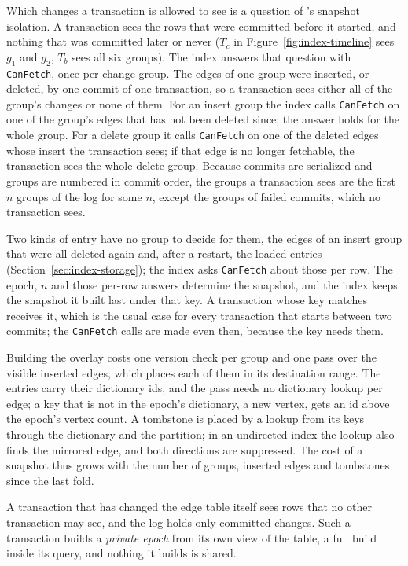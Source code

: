 Which changes a transaction is allowed to see is a question of \duckdb's snapshot isolation. A transaction sees the
rows that were committed before it started, and nothing that was committed later or never ($T_c$ in
Figure~\ref{fig:index-timeline} sees $g_1$ and $g_2$, $T_b$ sees all six groups). The index answers that question with \texttt{CanFetch}, once per change group. The edges of one group were inserted, or deleted, by one commit of one transaction, so a transaction sees either
all of the group's changes or none of them. For an insert group the index calls \texttt{CanFetch} on one of the
group's edges that has not been deleted since; the answer holds for the whole group. For a delete group it calls
\texttt{CanFetch} on one of the deleted edges whose insert the transaction sees; if that edge is no longer fetchable,
the transaction sees the whole delete group. Because commits are serialized and groups are numbered in commit order,
the groups a transaction sees are the first $n$ groups of the log for some $n$, except the groups of failed commits,
which no transaction sees.

Two kinds of entry have no group to decide for them, the edges of an insert group that were all deleted again and,
after a restart, the loaded entries (Section~\ref{sec:index-storage}); the index asks \texttt{CanFetch} about those
per row. The epoch, $n$ and those per-row answers determine the snapshot, and the index keeps the snapshot it built
last under that key. A transaction whose key matches receives it, which is the usual case for every transaction that
starts between two commits; the \texttt{CanFetch} calls are made even then, because the key needs them.

Building the overlay costs one version check per group and one pass over the visible inserted edges, which places each
of them in its destination range. The entries carry their dictionary ids, and the pass needs no dictionary lookup per
edge; a key that is not in the epoch's dictionary, a new vertex, gets an id above the epoch's vertex count. A tombstone is placed by a lookup from its keys through the dictionary and the partition; in an undirected index the
lookup also finds the mirrored edge, and both directions are suppressed. The cost of a snapshot thus grows with the
number of groups, inserted edges and tombstones since the last fold.

A transaction that has changed the edge table itself sees rows that no other transaction may see, and the log holds
only committed changes. Such a transaction builds a \emph{private epoch} from its own view of the table, a full build
inside its query, and nothing it builds is shared.

